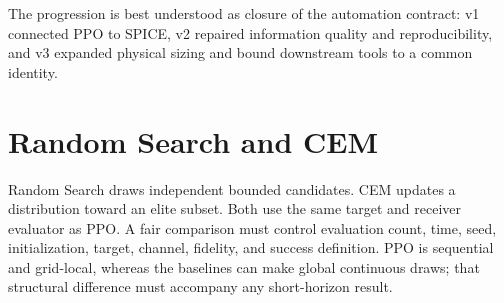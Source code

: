 The progression is best understood as closure of the automation contract: v1
connected PPO to SPICE, v2 repaired information quality and reproducibility, and
v3 expanded physical sizing and bound downstream tools to a common identity.

\section{Random Search and CEM}

Random Search draws independent bounded candidates. CEM updates a distribution
toward an elite subset. Both use the same target and receiver evaluator as PPO.
A fair comparison must control evaluation count, time, seed, initialization,
target, channel, fidelity, and success definition. PPO is sequential and
grid-local, whereas the baselines can make global continuous draws; that
structural difference must accompany any short-horizon result.
